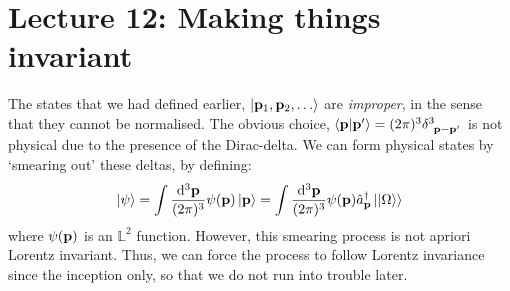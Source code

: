 \section*{Lecture 12: Making things invariant}
The states that we had defined earlier, $\ket{\vb{p}_1, \vb{p}_2, \ldots}$ are \textit{improper}, in the sense that they cannot be normalised. The obvious choice, $\braket{\vb{p}|\vb{p'}} = (2\pi)^3 \delt{3}{\vb{p}-\vb{p}'}$ is not physical due to the presence of the Dirac-delta. We can form physical states by `smearing out' these deltas, by defining:
$$\ket{\psi} = \int \frac{\dd^3\vb{{\vb{p}}}}{(2\pi)^3}\psi(\vb{p})\ket{\vb{p}} = \int \frac{\dd^3\vb{{\vb{p}}}}{(2\pi)^3}\psi(\vb{p})\hat{a}_{\vb{p}}^\dagger\ket{\ket{\Omega}}$$ where $\psi(\vb{p})$ is an $\mathbb{L}^2$ function. However, this smearing process is not apriori Lorentz invariant. Thus, we can force the process to follow Lorentz invariance since the inception only, so that we do not run into trouble later.
